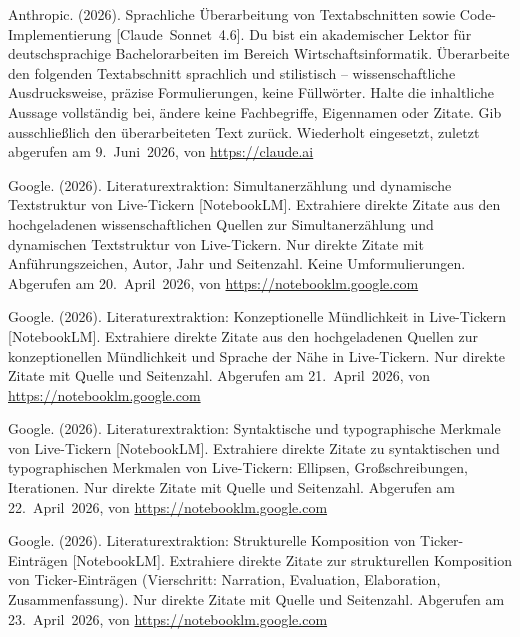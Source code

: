 \begin{description}[leftmargin=0pt, itemsep=0.6em]

\item Anthropic. (2026). Sprachliche Überarbeitung von Textabschnitten sowie Code-Implementierung [Claude~Sonnet~4.6]. \glqq{}Du bist ein akademischer Lektor für deutschsprachige Bachelorarbeiten im Bereich Wirtschaftsinformatik. Überarbeite den folgenden Textabschnitt sprachlich und stilistisch – wissenschaftliche Ausdrucksweise, präzise Formulierungen, keine Füllwörter. Halte die inhaltliche Aussage vollständig bei, ändere keine Fachbegriffe, Eigennamen oder Zitate. Gib ausschließlich den überarbeiteten Text zurück.\grqq{} Wiederholt eingesetzt, zuletzt abgerufen am 9.~Juni~2026, von \url{https://claude.ai}

\item Google. (2026). Literaturextraktion: Simultanerzählung und dynamische Textstruktur von Live-Tickern [NotebookLM]. \glqq{}Extrahiere direkte Zitate aus den hochgeladenen wissenschaftlichen Quellen zur Simultanerzählung und dynamischen Textstruktur von Live-Tickern. Nur direkte Zitate mit Anführungszeichen, Autor, Jahr und Seitenzahl. Keine Umformulierungen.\grqq{} Abgerufen am 20.~April~2026, von \url{https://notebooklm.google.com}

\item Google. (2026). Literaturextraktion: Konzeptionelle Mündlichkeit in Live-Tickern [NotebookLM]. \glqq{}Extrahiere direkte Zitate aus den hochgeladenen Quellen zur konzeptionellen Mündlichkeit und Sprache der Nähe in Live-Tickern. Nur direkte Zitate mit Quelle und Seitenzahl.\grqq{} Abgerufen am 21.~April~2026, von \url{https://notebooklm.google.com}

\item Google. (2026). Literaturextraktion: Syntaktische und typographische Merkmale von Live-Tickern [NotebookLM]. \glqq{}Extrahiere direkte Zitate zu syntaktischen und typographischen Merkmalen von Live-Tickern: Ellipsen, Großschreibungen, Iterationen. Nur direkte Zitate mit Quelle und Seitenzahl.\grqq{} Abgerufen am 22.~April~2026, von \url{https://notebooklm.google.com}

\item Google. (2026). Literaturextraktion: Strukturelle Komposition von Ticker-Einträgen [NotebookLM]. \glqq{}Extrahiere direkte Zitate zur strukturellen Komposition von Ticker-Einträgen (Vierschritt: Narration, Evaluation, Elaboration, Zusammenfassung). Nur direkte Zitate mit Quelle und Seitenzahl.\grqq{} Abgerufen am 23.~April~2026, von \url{https://notebooklm.google.com}


\end{description}
